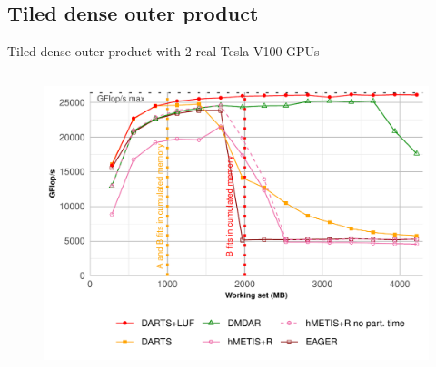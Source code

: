\documentclass{libs/ufc_format}
\begin{document}
\subsection{Tiled dense outer product}
\begin{frame}{Tiled dense outer product with 2 real Tesla V100 GPUs}
    \begin{columns}{}
        \begin{column}{0.5\textwidth}
	\begin{figure}
		\center\includegraphics[scale = 0.3]{Images/GF_dynamic_data_aware_no_hfp_gemini-2-ipdps_2GPU.pdf}
	\end{figure}
	\end{column}


\end{columns}
\end{frame}
\end{document}
